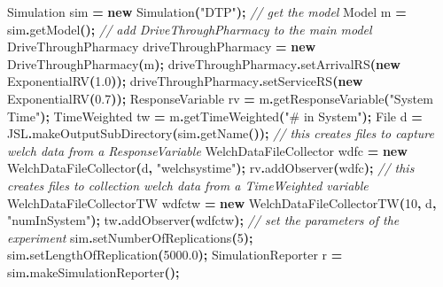 \documentclass[
]{book}
\newenvironment{Shaded}{\begin{snugshade}}{\end{snugshade}}
\newcommand{\BuiltInTok}[1]{#1}
\newcommand{\CommentTok}[1]{\textcolor[rgb]{0.56,0.35,0.01}{\textit{#1}}}
\newcommand{\DecValTok}[1]{\textcolor[rgb]{0.00,0.00,0.81}{#1}}
\newcommand{\FloatTok}[1]{\textcolor[rgb]{0.00,0.00,0.81}{#1}}
\newcommand{\FunctionTok}[1]{\textcolor[rgb]{0.00,0.00,0.00}{#1}}
\newcommand{\KeywordTok}[1]{\textcolor[rgb]{0.13,0.29,0.53}{\textbf{#1}}}
\newcommand{\NormalTok}[1]{#1}
\newcommand{\OperatorTok}[1]{\textcolor[rgb]{0.81,0.36,0.00}{\textbf{#1}}}
\newcommand{\StringTok}[1]{\textcolor[rgb]{0.31,0.60,0.02}{#1}}
\theoremstyle{definition}
\theoremstyle{definition}
\theoremstyle{definition}
\theoremstyle{definition}
\theoremstyle{remark}
\begin{document}
\begin{Shaded}
\begin{Highlighting}[]
\NormalTok{Simulation sim }\OperatorTok{=} \KeywordTok{new} \FunctionTok{Simulation}\OperatorTok{(}\StringTok{"DTP"}\OperatorTok{);}
\CommentTok{// get the model}
\NormalTok{Model m }\OperatorTok{=}\NormalTok{ sim}\OperatorTok{.}\FunctionTok{getModel}\OperatorTok{();}
\CommentTok{// add DriveThroughPharmacy to the main model}
\NormalTok{DriveThroughPharmacy driveThroughPharmacy }\OperatorTok{=} \KeywordTok{new} \FunctionTok{DriveThroughPharmacy}\OperatorTok{(}\NormalTok{m}\OperatorTok{);}
\NormalTok{driveThroughPharmacy}\OperatorTok{.}\FunctionTok{setArrivalRS}\OperatorTok{(}\KeywordTok{new} \FunctionTok{ExponentialRV}\OperatorTok{(}\FloatTok{1.0}\OperatorTok{));}
\NormalTok{driveThroughPharmacy}\OperatorTok{.}\FunctionTok{setServiceRS}\OperatorTok{(}\KeywordTok{new} \FunctionTok{ExponentialRV}\OperatorTok{(}\FloatTok{0.7}\OperatorTok{));}
\NormalTok{ResponseVariable rv }\OperatorTok{=}\NormalTok{ m}\OperatorTok{.}\FunctionTok{getResponseVariable}\OperatorTok{(}\StringTok{"System Time"}\OperatorTok{);}
\NormalTok{TimeWeighted tw }\OperatorTok{=}\NormalTok{ m}\OperatorTok{.}\FunctionTok{getTimeWeighted}\OperatorTok{(}\StringTok{"\# in System"}\OperatorTok{);}
\BuiltInTok{File}\NormalTok{ d }\OperatorTok{=}\NormalTok{ JSL}\OperatorTok{.}\FunctionTok{makeOutputSubDirectory}\OperatorTok{(}\NormalTok{sim}\OperatorTok{.}\FunctionTok{getName}\OperatorTok{());}
\CommentTok{// this creates files to capture welch data from a ResponseVariable}
\NormalTok{WelchDataFileCollector wdfc }\OperatorTok{=} \KeywordTok{new} \FunctionTok{WelchDataFileCollector}\OperatorTok{(}\NormalTok{d}\OperatorTok{,} \StringTok{"welchsystime"}\OperatorTok{);}
\NormalTok{rv}\OperatorTok{.}\FunctionTok{addObserver}\OperatorTok{(}\NormalTok{wdfc}\OperatorTok{);}
\CommentTok{// this creates files to collection welch data from a TimeWeighted variable}
\NormalTok{WelchDataFileCollectorTW wdfctw }\OperatorTok{=} \KeywordTok{new} \FunctionTok{WelchDataFileCollectorTW}\OperatorTok{(}\DecValTok{10}\OperatorTok{,}\NormalTok{ d}\OperatorTok{,} \StringTok{"numInSystem"}\OperatorTok{);}
\NormalTok{tw}\OperatorTok{.}\FunctionTok{addObserver}\OperatorTok{(}\NormalTok{wdfctw}\OperatorTok{);}
\CommentTok{// set the parameters of the experiment}
\NormalTok{sim}\OperatorTok{.}\FunctionTok{setNumberOfReplications}\OperatorTok{(}\DecValTok{5}\OperatorTok{);}
\NormalTok{sim}\OperatorTok{.}\FunctionTok{setLengthOfReplication}\OperatorTok{(}\FloatTok{5000.0}\OperatorTok{);}
\NormalTok{SimulationReporter r }\OperatorTok{=}\NormalTok{ sim}\OperatorTok{.}\FunctionTok{makeSimulationReporter}\OperatorTok{();}

\end{Highlighting}
\end{Shaded}
\end{document}
